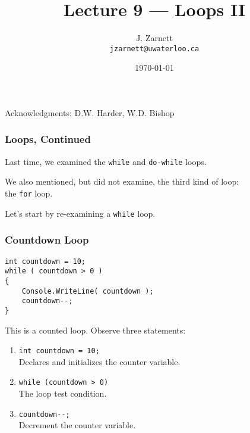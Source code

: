 

\title{Lecture 9 --- Loops II}

\author{J. Zarnett\\
\texttt{jzarnett@uwaterloo.ca}}
\date{\today}



\begin{frame}
  \titlepage
  
  \begin{center}
  \small{Acknowledgments: D.W. Harder, W.D. Bishop}
  \end{center}
 \end{frame}
 

\begin{frame}
\frametitle{Loops, Continued}
Last time, we examined the \texttt{while} and \texttt{do-while} loops.

We also mentioned, but did not examine, the third kind of loop:\\
\quad the \texttt{for} loop.

Let's start by re-examining a \texttt{while} loop.

\end{frame}


\begin{frame}[fragile]
\frametitle{Countdown Loop}

\begin{verbatim}
int countdown = 10;
while ( countdown > 0 ) 
{
    Console.WriteLine( countdown );
    countdown--;
}
\end{verbatim}

This is a counted loop. Observe three statements:
\begin{enumerate}
	\item \texttt{int countdown = 10;}\\
		\quad Declares and initializes the counter variable.
	\item \texttt{while (countdown > 0)}\\
		\quad The loop test condition.
	\item \texttt{countdown{-}{-};}\\
		\quad Decrement the counter variable.
\end{enumerate}

\end{frame}

